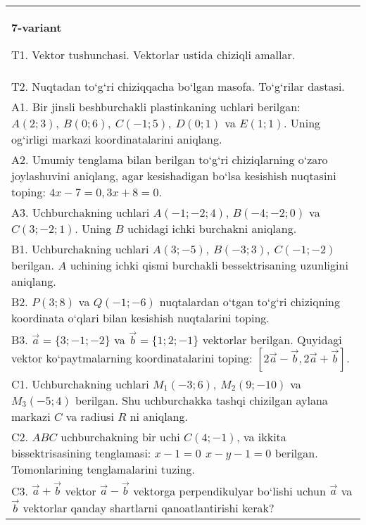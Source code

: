\documentclass{article}
\begin{document}
\begin{tabular}{m{17cm}}
\textbf{7-variant}
\newline

T1. 
Vektor tushunchasi. Vektorlar ustida chiziqli amallar.
 \\
T2. 
Nuqtadan to‘g‘ri chiziqqacha bo‘lgan masofa. To‘g‘rilar dastasi.
 \\
A1. 
Bir jinsli beshburchakli plastinkaning uchlari berilgan:
$A (2;3), \ B (0;6), \ C (-1;5), \ D (0;1) $ va $E (1;1) $. Uning og‘irligi
markazi koordinatalarini aniqlang.
 \\
A2. 
Umumiy tenglama bilan berilgan to‘g‘ri chiziqlarning
o‘zaro joylashuvini aniqlang, agar kesishadigan bo‘lsa kesishish nuqtasini
toping: $4x-7=0, 3x+8=0$.
 \\
A3. 
Uchburchakning uchlari
$A (- 1; - 2;4) $, $B (- 4; - 2;0) $ va $C (3; -2;1) $. Uning $B$ uchidagi
ichki burchakni aniqlang.
 \\
B1. 
Uchburchakning uchlari
\(A (3;-5),\ B (-3;3),\ C (-1;-2) \) berilgan. $A$ uchining ichki qismi
burchakli bessektrisaning uzunligini aniqlang.
 \\
B2. 
\(P (3;8) \) va \(Q (-1;-6) \) nuqtalardan o‘tgan
to‘g‘ri chiziqning koordinata o‘qlari bilan kesishish nuqtalarini toping.
 \\
B3. 
$\vec{a} = \{ 3; - 1; - 2\}$ va $\vec{b} = \{ 1;2; - 1\}$ vektorlar berilgan. Quyidagi vektor ko‘paytmalarning koordinatalarini toping:
$\left\lbrack 2\vec{a} - \vec{b},2\vec{a} + \vec{b} \right\rbrack$.
 \\
C1. 
Uchburchakning uchlari \(M_{1} (- 3;6),\ M_{2} (9; - 10) \)
va \(M_{3} (-5;4) \) berilgan. Shu uchburchakka tashqi chizilgan
aylana markazi $C$ va radiusi $R$ ni aniqlang.
 \\
C2. 
$ABC$ uchburchakning bir uchi \(C (4; - 1) \), va
ikkita bissektrisasining tenglamasi: \(x - 1 = 0\,\ x - y - 1 = 0\)
berilgan. Tomonlarining tenglamalarini tuzing.
 \\
C3. 
\(\vec{a} + \vec{b}\) vektor \(\vec{a} - \vec{b}\) vektorga perpendikulyar bo‘lishi uchun \(\vec{a}\) va \(\vec{b}\) vektorlar qanday shartlarni qanoatlantirishi kerak?
 \\

\end{tabular}
\vspace{1cm}
\end{document}
